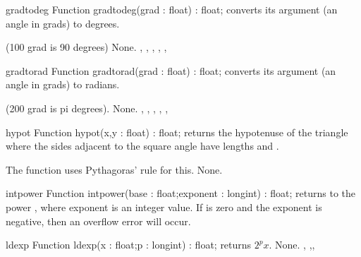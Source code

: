 

\begin{function}{gradtodeg}
\Declaration
Function gradtodeg(grad : float) : float;
\Description
{} converts its argument  (an angle in grads)
to degrees.

(100 grad is 90 degrees)
\Errors
None.
\SeeAlso
{}, , ,
, , 
\end{function}



\begin{function}{gradtorad}
\Declaration
Function gradtorad(grad : float) : float;
\Description
{} converts its argument  (an angle in grads)
to radians.

(200 grad is pi degrees).
\Errors
None.
\SeeAlso
{}, , ,
, , 
\end{function}



\begin{function}{hypot}
\Declaration
Function hypot(x,y : float) : float;
\Description
{} returns the hypotenuse of the triangle where the sides
adjacent to the square angle have lengths  and .

The function uses Pythagoras' rule for this.
\Errors
None.
\SeeAlso
\end{function}



\begin{function}{intpower}
\Declaration
Function intpower(base : float;exponent : longint) : float;
\Description
{} returns  to the power ,
where exponent is an integer value.
\Errors
If  is zero and the exponent is negative, then an
overflow error will occur.
\SeeAlso
{}
\end{function}



\begin{function}{ldexp}
\Declaration
Function ldexp(x : float;p : longint) : float;
\Description
{} returns $2^p x$.
\Errors
None.
\SeeAlso
{}, ,,
\end{function}



